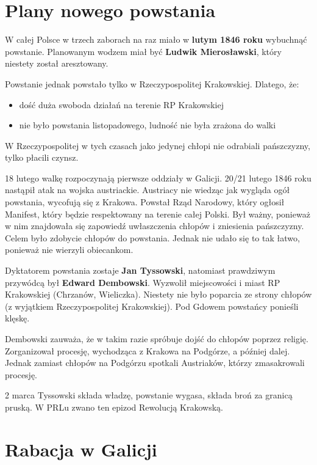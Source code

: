 \documentclass [a4paper, 11pt, oneside]{book}
\begin{document}
    \section{Plany nowego powstania} %
    \label{sec:plany_nowego_powstania}
        W całej Polsce w trzech zaborach na raz miało w \textbf{lutym 1846 roku} wybuchnąć powstanie. Planowanym wodzem miał być \textbf{Ludwik Mierosławski}, który niestety został aresztowany.

        Powstanie jednak powstało tylko w Rzeczypospolitej Krakowskiej. Dlatego, że:
        \begin{itemize}
            \item dość duża swoboda działań na terenie RP Krakowskiej
            \item nie było powstania listopadowego, ludność nie była zrażona do walki
        \end{itemize}
        W Rzeczypospolitej w tych czasach jako jedynej chłopi nie odrabiali pańszczyzny, tylko płacili czynsz.

        18 lutego walkę rozpoczynają pierwsze oddziały w Galicji. 20/21 lutego 1846 roku nastąpił atak na wojska austriackie. Austriacy nie wiedząc jak wygląda ogół powstania, wycofują się z Krakowa. Powstał Rząd Narodowy, który ogłosił Manifest, który będzie respektowany na terenie całej Polski. Był ważny, ponieważ w nim znajdowała się zapowiedź uwłaszczenia chłopów i zniesienia pańszczyzny. Celem było zdobycie chłopów do powstania. Jednak nie udało się to tak łatwo, ponieważ nie wierzyli obiecankom.

        Dyktatorem powstania zostaje \textbf{Jan Tyssowski}, natomiast prawdziwym przywódcą był \textbf{Edward Dembowski}. Wyzwolił miejscowości i miast RP Krakowskiej (Chrzanów, Wieliczka). Niestety nie było poparcia ze strony chłopów (z wyjątkiem Rzeczypospolitej Krakowskiej). Pod Gdowem powstańcy ponieśli klęskę.

        Dembowski zauważa, że w takim razie spróbuje dojść do chłopów poprzez religię. Zorganizował procesję, wychodząca z Krakowa na Podgórze, a później dalej. Jednak zamiast chłopów na Podgórzu spotkali Austriaków, którzy zmasakrowali procesję.

        2 marca Tyssowski składa władzę, powstanie wygasa, składa broń za granicą pruską. W PRLu zwano ten epizod Rewolucją Krakowską.
    \section{Rabacja w Galicji} %
    \label{sec:rabacja_w_galicji}
\end{document}
